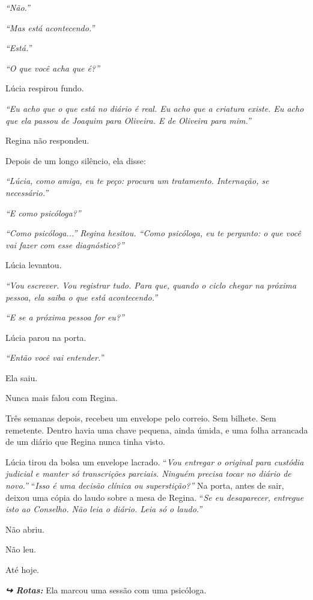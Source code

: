 \noindent \textit{\textquotedblleft{}Não.\textquotedblright{}}

\noindent \textit{\textquotedblleft{}Mas está acontecendo.\textquotedblright{}}

\noindent \textit{\textquotedblleft{}Está.\textquotedblright{}}

\noindent \textit{\textquotedblleft{}O que você acha que é?\textquotedblright{}}

\noindent Lúcia respirou fundo.

\noindent \textit{\textquotedblleft{}Eu acho que o que está no diário é real. Eu acho que a criatura existe. Eu acho que ela passou de Joaquim para Oliveira. E de Oliveira para mim.\textquotedblright{}}

\noindent Regina não respondeu.

\noindent Depois de um longo silêncio, ela disse:

\noindent \textit{\textquotedblleft{}Lúcia, como amiga, eu te peço: procura um tratamento. Internação, se necessário.\textquotedblright{}}

\noindent \textit{\textquotedblleft{}E como psicóloga?\textquotedblright{}}

\noindent \textit{\textquotedblleft{}Como psicóloga...\textquotedblright{}\textit{ Regina hesitou. }\textquotedblleft{}Como psicóloga, eu te pergunto: o que você vai fazer com esse diagnóstico?\textquotedblright{}}

\noindent Lúcia levantou.

\noindent \textit{\textquotedblleft{}Vou escrever. Vou registrar tudo. Para que, quando o ciclo chegar na próxima pessoa, ela saiba o que está acontecendo.\textquotedblright{}}

\noindent \textit{\textquotedblleft{}E se a próxima pessoa for eu?\textquotedblright{}}

\noindent Lúcia parou na porta.

\noindent \textit{\textquotedblleft{}Então você vai entender.\textquotedblright{}}

\noindent Ela saiu.

\noindent Nunca mais falou com Regina.

\noindent Três semanas depois, recebeu um envelope pelo correio. Sem bilhete. Sem remetente.
\noindent Dentro havia uma chave pequena, ainda úmida, e uma folha arrancada de um diário que Regina nunca tinha visto.

\noindent Lúcia tirou da bolsa um envelope lacrado.
\noindent \textquotedblleft{\textit{Vou entregar o original para custódia judicial e manter só transcrições parciais. Ninguém precisa tocar no diário de novo.\textquotedblright{}}}
\noindent \textquotedblleft{\textit{Isso é uma decisão clínica ou superstição?\textquotedblright{}}}
\noindent Na porta, antes de sair, deixou uma cópia do laudo sobre a mesa de Regina.
\noindent \textquotedblleft{\textit{Se eu desaparecer, entregue isto ao Conselho. Não leia o diário. Leia só o laudo.\textquotedblright{}}}

\noindent Não abriu.

\noindent Não leu.

\noindent Até hoje.

\vspace{0.5em}
\noindent\textit{\textbf{↪ Rotas:}  \rotasep {}}
\noindent Ela marcou uma sessão com uma psicóloga.